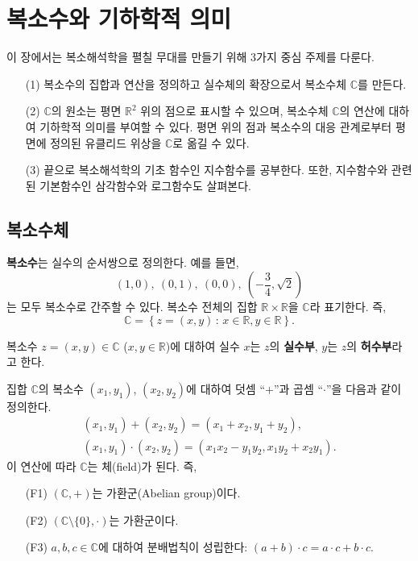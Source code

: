
\chapter{복소수와 기하학적 의미}


이 장에서는 복소해석학을 펼칠 무대를 만들기 위해
 3가지 중심 주제를 다룬다.
\begin{itemize}
\item[(1)] 복소수의 집합과 연산을 정의하고 실수체의 확장으로서 복소수체 $\mathbb C$를 만든다.
\item[(2)] $\mathbb C$의 원소는 평면 $\mathbb R^2$ 위의 점으로 표시할 수 있으며, 복소수체 $\mathbb C$의 연산에 대하여
기하학적 의미를 부여할 수 있다.  평면 위의 점과  복소수의 대응 관계로부터
평면에 정의된 유클리드 위상을 $\mathbb C$로 옮길 수 있다.
\item[(3)] 끝으로 복소해석학의 기초 함수인 지수함수를 공부한다.
또한, 지수함수와 관련된 기본함수인 삼각함수와 로그함수도 살펴본다. 
\end{itemize}

\section{복소수체}

{\bf 복소수}는 실수의 순서쌍으로 정의한다. 예를 들면,
$$
(1,0), \ (0,1), \ (0,0), \ \left(-\dfrac34, \sqrt{2} \right)
$$
는 모두 복소수로 간주할 수 있다.
복소수 전체의 집합 $\mathbb R \times \mathbb R$을 $\mathbb C$라 표기한다. 즉,
$$
\mathbb C = \left\{ z = (x,y) \,:\, x\in \mathbb R,   y\in \mathbb R \right\}.
$$

복소수 $z=(x,y)\in \mathbb C$ ($x,y \in \mathbb R$)에 대하여
실수 $x$는 $z$의 \textbf{실수부}, $y$는 $z$의 \textbf{허수부}라고 한다.

집합 $\mathbb C$의
복소수 $(x_1, y_1)$, $(x_2, y_2)$에 대하여
덧셈 ``$+$''과 곱셈 ``$\cdot$''을 다음과 같이 정의한다.
\begin{gather*}
(x_1, y_1) + (x_2, y_2) = (x_1+x_2, y_1+y_2), \\
(x_1, y_1) \cdot (x_2, y_2) = (x_1x_2 - y_1y_2, x_1y_2 + x_2y_1).
\end{gather*}
이 연산에 따라 $\mathbb C$는 체(field)가 된다. 즉,
\begin{itemize}
\item[(F1)]  $(\mathbb C, +)$는 가환군(Abelian group)이다.
\item[(F2)] $(\mathbb C\setminus \{0\}, \cdot)$는 가환군이다.
\item[(F3)] $a,b,c\in\mathbb C$에 대하여 분배법칙이 성립한다:  $(a+b)\cdot c = a\cdot c + b\cdot c$.
\end{itemize}

